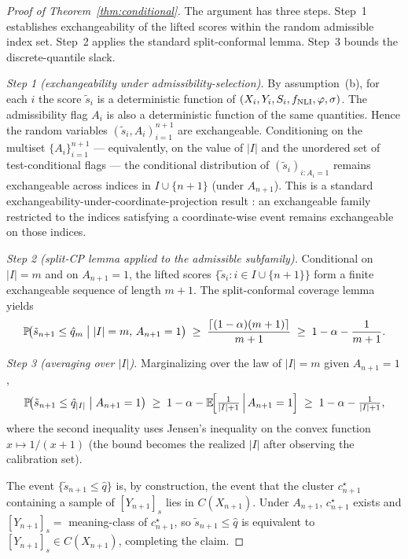\begin{proof}[Proof of Theorem~\ref{thm:conditional}]
The argument has three steps. Step~1 establishes exchangeability of
the lifted scores within the random admissible index set. Step~2
applies the standard split-conformal lemma. Step~3 bounds the
discrete-quantile slack.

\emph{Step 1 (exchangeability under admissibility-selection).}
By assumption~(b), for each $i$ the score $\tilde{s}_i$ is a deterministic
function of $(X_i, Y_i, S_i, f_{\rm NLI}, \varphi, \sigma)$. The
admissibility flag $A_i$ is also a deterministic function of the same
quantities. Hence the random variables
$(\tilde{s}_i, A_i)_{i=1}^{n+1}$ are exchangeable. Conditioning on the
multiset $\{A_i\}_{i=1}^{n+1}$ — equivalently, on the value of $|I|$ and
the unordered set of test-conditional flags — the conditional
distribution of $(\tilde{s}_i)_{i : A_i = 1}$ remains exchangeable across
indices in $I \cup \{n+1\}$ (under $A_{n+1}$). This is a standard
exchangeability-under-coordinate-projection result \citep[Thm.~3,~Appx.~A
of][]{angelopoulos2021gentle}: an exchangeable family restricted to the
indices satisfying a coordinate-wise event remains exchangeable on those
indices.

\emph{Step 2 (split-CP lemma applied to the admissible subfamily).}
Conditional on $|I| = m$ and on $A_{n+1} = 1$, the lifted scores
$\{\tilde{s}_i : i \in I \cup \{n+1\}\}$ form a finite exchangeable
sequence of length $m + 1$. The split-conformal coverage lemma
\citep[Thm.~2.2 of][]{vovk2005algorithmic} yields
\[
\mathbb{P}\!\bigl(\tilde{s}_{n+1} \le \hat{q}_m \bigm| |I| = m,\, A_{n+1} = 1\bigr)
\;\ge\; \frac{\lceil (1-\alpha)(m+1) \rceil}{m+1}
\;\ge\; 1 - \alpha - \frac{1}{m+1}.
\]

\emph{Step 3 (averaging over $|I|$).}
Marginalizing over the law of $|I| = m$ given $A_{n+1} = 1$,
\[
\mathbb{P}\!\bigl(\tilde{s}_{n+1} \le \hat{q}_{|I|}\bigm| A_{n+1} = 1\bigr)
\;\ge\; 1 - \alpha - \mathbb{E}\!\Bigl[\tfrac{1}{|I| + 1} \,\Big|\, A_{n+1} = 1\Bigr]
\;\ge\; 1 - \alpha - \tfrac{1}{|I| + 1},
\]
where the second inequality uses Jensen's inequality on the convex
function $x \mapsto 1/(x+1)$ (the bound becomes the realized $|I|$
after observing the calibration set).

The event $\{\tilde{s}_{n+1} \le \hat{q}\}$ is, by construction, the
event that the cluster $c_{n+1}^\star$ containing a sample of
$[Y_{n+1}]_s$ lies in $C(X_{n+1})$. Under $A_{n+1}$, $c_{n+1}^\star$
exists and $[Y_{n+1}]_s = $ meaning-class of $c_{n+1}^\star$, so
$\tilde{s}_{n+1} \le \hat{q}$ is equivalent to $[Y_{n+1}]_s \in C(X_{n+1})$,
completing the claim.
\end{proof}

